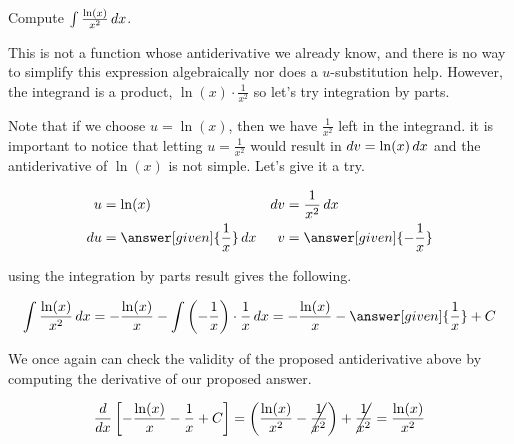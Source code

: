 \documentclass[noauthor]{ximera}
\begin{document}

\begin{example}
Compute $\int \frac{\ln(x)}{x^2} \mathop{}\!d x$.

\begin{explanation}
This is not a function whose antiderivative we already know, and there is no way to simplify this expression algebraically nor does a $u$-substitution help.  However, the integrand is a product, $\ln(x)\cdot \frac{1}{x^2}$ so let's try integration by parts.

Note that if we choose $u=\ln(x)$, then we have $\frac{1}{x^2}$ left in the integrand. it is important to notice that letting $u=\frac{1}{x^2}$ would result in $\mathop{}\!d v = \ln(x)\mathop{}\!d x$ and the antiderivative of $\ln(x)$ is not simple. Let's give it a try.

\begin{align*}
u &= \ln(x) & \d v & = \frac{1}{x^2} \d x \\
 \d u &= \answer[given]{\frac{1}{x}} \d x & v & = \answer[given]{-\frac{1}{x}}
\end{align*}

using the integration by parts result gives the following.

\[
\int \frac{\ln(x)}{x^2} \d x= -\frac{\ln(x)}{x} - \int \left( -\frac{1}{x} \right)\cdot \frac{1}{x} \d x= -\frac{\ln(x)}{x} - \answer[given]{\frac{1}{x}} + C
\]

\end{explanation}

We once again can check the validity of the proposed antiderivative above by computing the derivative of our proposed answer.

\[
\frac{d}{\mathop{}\!d x} \left[-\frac{\ln(x)}{x} - \frac{1}{x} + C\right] = \left( \frac{\ln(x)}{x^2} - \cancel{\frac{1}{x^2}} \right) + \cancel{\frac{1}{x^2}}= \frac{\ln(x)}{x^2}
\]

\end{example}
\end{document}
